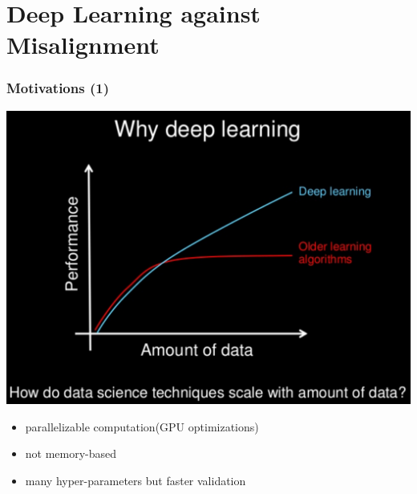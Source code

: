 \section{Deep Learning against Misalignment}
\begin{frame}
\frametitle{Motivations (1)}
\includegraphics[width=.5\textwidth]{figures/whydeeplearning.png} 
\begin{itemize}
\item parallelizable computation(GPU optimizations)
\item not memory-based
\item many hyper-parameters but faster validation
\end{itemize}

\end{frame}

